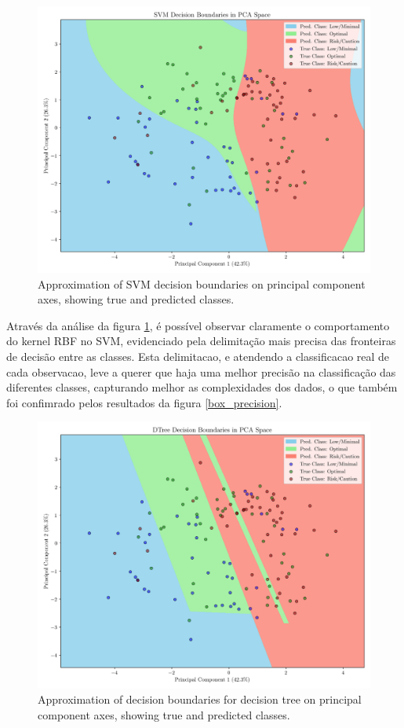 \documentclass[conference]{IEEEtran}
\begin{document}
\begin{figure}[H]
    \centering
    \includegraphics[width=1\linewidth]{assets/pca_svm.png}
    \caption{Approximation of SVM decision boundaries on principal component axes, showing true and predicted classes.}
    \label{pca_svm}
\end{figure}

Através da análise da figura \ref{pca_svm}, é possível observar claramente o comportamento do kernel RBF no SVM, evidenciado pela delimitação mais precisa das fronteiras de decisão entre as classes. Esta delimitacao, e atendendo a classificacao real de cada observacao, leve a querer que haja uma melhor precisão na classificação das diferentes classes, capturando melhor as complexidades dos dados, o que também foi confimrado pelos resultados da figura \ref{box_precision}.

\begin{figure}[H]
    \centering
    \includegraphics[width=1\linewidth]{assets/pca_dtree.png}
    \caption{Approximation of decision boundaries for decision tree on principal component axes, showing true and predicted classes.}
    \label{pca_dtree}
\end{figure}
\end{document}
